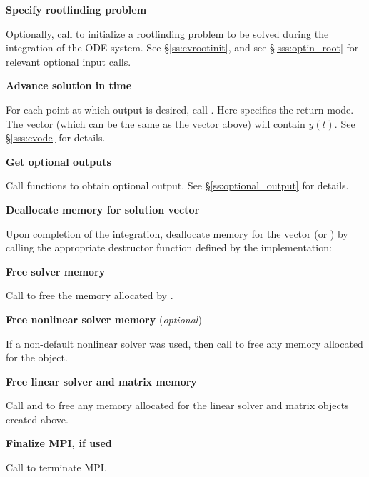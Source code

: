 \begin{Steps}
\item
  {\bf Specify rootfinding problem}

  Optionally, call  to initialize a rootfinding problem
  to be solved during the integration of the ODE system.
  See \S\ref{ss:cvrootinit}, and see \S\ref{sss:optin_root} for
  relevant optional input calls.

\item
  {\bf Advance solution in time}

  For each point at which output is desired, call
  .
  Here  specifies the return mode.
  The vector  (which can be the same as
  the vector  above) will contain $y(t)$.
  See \S\ref{sss:cvode} for details.

\item
  {\bf Get optional outputs}

  Call  functions to obtain optional output.
  See \S\ref{ss:optional_output} for details.

\item
  {\bf Deallocate memory for solution vector}

  Upon completion of the integration, deallocate memory for the vector 
  (or ) by calling the appropriate destructor function defined by the
  {\nvector} implementation:


\item
  {\bf Free solver memory}

  Call  to free the memory allocated by {\cvode}.

\item
  {\bf Free nonlinear solver memory} (\textit{optional})

  If a non-default nonlinear solver was used, then call
   to free any memory allocated for the
  {\sunnonlinsol} object.

\item
  {\bf Free linear solver and matrix memory}

  Call  and  to free any memory
  allocated for the linear solver and matrix objects created above.

\item
  {\bf Finalize MPI, if used}

  Call  to terminate MPI.

\end{Steps}

